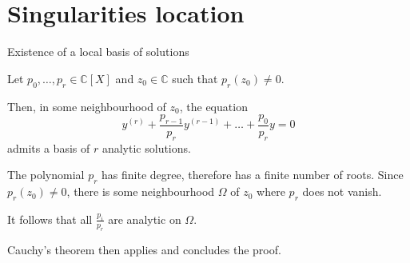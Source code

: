 \documentclass[../main.tex]{subfiles}
\begin{document}


\section{Singularities location}

%
%
%
%
%
%
%


\begin{thm}{Existence of a local basis of solutions}
	
	Let $p_0, \dots, p_r \in \mathbb{C}[X]$ and $z_0 \in \mathbb{C}$ such that $p_r (z_0) \neq 0$.
	
	Then, in some neighbourhood of $z_0$, the equation
	\begin{equation}
	y^{(r)} + \frac{p_{r-1}}{p_r} y^{(r - 1)} + \dots + \frac{p_0}{p_r} y = 0
	\end{equation}
	admits a basis of $r$ analytic solutions.
	
	\tcblower
	
	The polynomial $p_r$ has finite degree, therefore has a finite number of roots. Since $p_r(z_0) \neq 0$, there is some neighbourhood $\Omega$ of $z_0$ where $p_r$ does not vanish.
	
	It follows that all $\frac{p_i}{p_r}$ are analytic on $\Omega$.
	
	Cauchy's theorem then applies and concludes the proof.
\end{thm}
\end{document}
